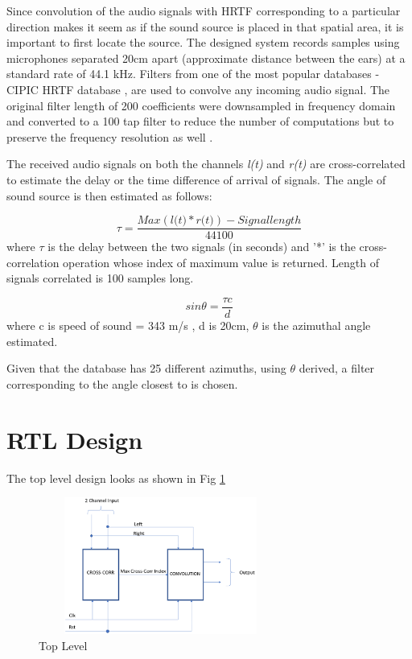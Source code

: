 \documentclass[conference]{IEEEtran}
\begin{document}
Since convolution of the audio signals with HRTF corresponding to a particular direction makes it seem as if the sound source is placed in that spatial area, it is important to first locate the source. The designed system records samples using microphones separated 20cm apart (approximate distance between the ears) at a standard rate of 44.1 kHz. Filters from one of the most popular databases - CIPIC HRTF database \cite{cipic}, are used to convolve any incoming audio signal. The original filter length of 200 coefficients were downsampled in frequency domain and converted to a 100 tap filter to reduce the number of computations but to preserve the frequency resolution as well .

The received audio signals on both the channels \textit{l(t)} and \textit{r(t)} are cross-correlated to estimate the delay or the time difference of arrival of signals. The angle of sound source is then estimated as follows: 

\begin{equation}
\tau = \frac{Max(\textit{l(t)} * \textit{r(t)}) - Signal length}{44100} 
\label{tdelay}
\end{equation}
where $\tau$ is the delay between the two signals (in seconds) and '*' is the cross-correlation operation whose index of maximum value is returned. Length of signals correlated is 100 samples long. 

\begin{equation}
sin\theta = \frac{\tau c}{d}
\label{angle}
\end{equation}
where c is speed of sound = 343 m/s , d is 20cm, $\theta$ is the azimuthal angle estimated.

Given that the database has 25 different azimuths, using $\theta$ derived, a filter corresponding to the angle closest to is chosen.         

\section{RTL Design}
The top level design looks as shown in Fig \ref{fig:top_level}

\begin{figure}
    \centering
    \includegraphics[width = 8cm, height = 4.5cm]{overall_design.png}
    \caption{Top Level}
    \label{fig:top_level}
\end{figure}
\end{document}
